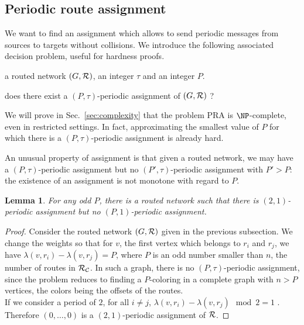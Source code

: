 \documentclass[a4paper,10pt]{article}
\newtheorem{lemma}[theorem]{Lemma}
\begin{document}
      \subsection{Periodic route assignment}\label{nonmonotone}

    We want to find an assignment which allows to send periodic messages from sources to targets
    without collisions. We introduce the following associated decision problem, useful for hardness proofs.
    


       a routed network $(G,\cal R)$, an integer $\tau$ and an integer $P$.

       does there exist a $(P,\tau)$-periodic assignment of $(G,\cal R)$ ?


      We will prove in Sec.~\ref{sec:complexity} that the problem PRA is $\NP$-complete, even in restricted settings.
      In fact, approximating the smallest value of $P$ for which there is a $(P,\tau)$-periodic assignment is already hard.
      
      An unusual property of assignment is that given a routed network, we may have a $(P,\tau)$-periodic assignment but no
      $(P',\tau)$-periodic assignment with $P' > P$: the existence of an assignment is not monotone with regard to $P$.

	\begin{lemma} \label{lemma:monotonic}
	 For any odd $P$, there is a routed network such that there is $(2,1)$-periodic assignment but no $(P,1)$-periodic assignment.
	\end{lemma}
\begin{proof}

      Consider the routed network $(G,{\cal R})$ given in the previous subsection. 
      We change the weights so that for $v$, the first vertex which belongs to $r_i$ and $r_j$,
      we have $\lambda(v,r_i) - \lambda(v,r_j)= P$, where $P$ is an odd number smaller than $n$, the number of routes in ${\cal R_{\cal C}}$. In such a graph, there is no $(P,\tau)$-periodic assignment, since the problem reduces to finding a $P$-coloring in a complete graph with $n > P$ vertices, the colors being the offsets of the routes.\\
      If we consider a period of $2$, for all $i \neq j$, $\lambda(v,r_i) - \lambda(v,r_j) \mod 2 = 1$ . Therefore $(0,\dots,0)$ is a $(2,1)$-periodic assignment of ${\cal R}$.      
\end{proof}
      
\end{document}
